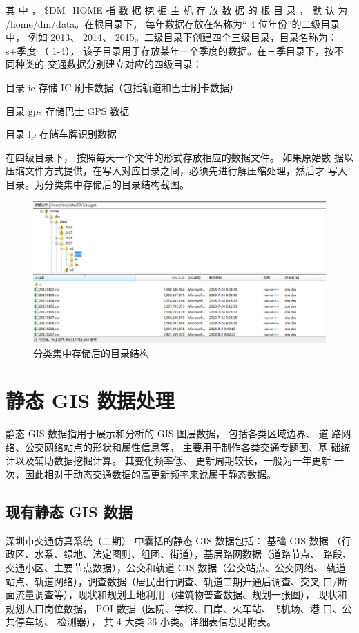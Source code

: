 其 中 ， \$DM\_HOME 指 数 据 挖 掘 主 机 存 放 数 据 的 根 目 录 ， 默 认 为
/home/dm/data。在根目录下， 每年数据存放在名称为“ 4 位年份”的二级目录中，
例如 2013、 2014、 2015。二级目录下创建四个三级目录，目录名称为： s+季度
（ 1-4）， 该子目录用于存放某年一个季度的数据。在三季目录下，按不同种类的
交通数据分别建立对应的四级目录：

\begin{para}
\item[目录 ic] 存储 IC 刷卡数据（包括轨道和巴士刷卡数据）
\item[目录 gps] 存储巴士 GPS 数据
\item[目录 lp] 存储车牌识别数据
\end{para}

在四级目录下， 按照每天一个文件的形式存放相应的数据文件。 如果原始数
据以压缩文件方式提供，在写入对应目录之间，必须先进行解压缩处理，然后才
写入目录。为分类集中存储后的目录结构截图。

\clearpage
\begin{figure}[!ht]
  \centering
  \includegraphics[width=\textwidth]{figures/chp02_分类集中存储后的目录结构.jpg}
  \caption{分类集中存储后的目录结构\label{fig:分类集中存储后的目录结构}} 
\end{figure}

\section{静态 GIS 数据处理}
静态 GIS 数据指用于展示和分析的 GIS 图层数据， 包括各类区域边界、 道
路网络、公交网络站点的形状和属性信息等， 主要用于制作各类交通专题图、基
础统计以及辅助数据挖掘计算。 其变化频率低、 更新周期较长，一般为一年更新
一次，因此相对于动态交通数据的高更新频率来说属于静态数据。

\subsection{现有静态 GIS 数据}
深圳市交通仿真系统（二期） 中囊括的静态 GIS 数据包括： 基础 GIS 数据
（行政区、水系、绿地、法定图则、组团、街道），基层路网数据（道路节点、
路段、交通小区、主要节点数据），公交和轨道 GIS 数据（公交站点、公交网络、
轨道站点、轨道网络），调查数据（居民出行调查、轨道二期开通后调查、交叉
口/断面流量调查等），现状和规划土地利用（建筑物普查数据、规划一张图），
现状和规划人口岗位数据， POI 数据（医院、学校、口岸、火车站、飞机场、港
口、公共停车场、 检测器）， 共 4 大类 26 小类。详细表信息见附表。

